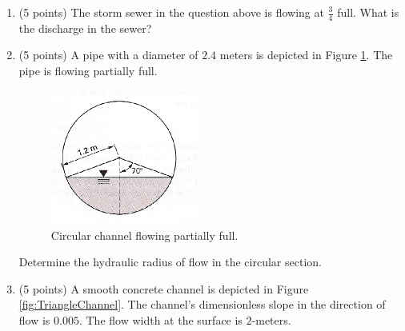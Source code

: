 \documentclass[12pt]{article}
\begin{document}
\begin{enumerate}
\clearpage
\item (5 points) The storm sewer in the question above is flowing at $\frac{3}{4}$ full.  What is the discharge in the sewer?
\clearpage
\item  (5 points) A pipe with a diameter of $2.4$ meters is depicted in Figure \ref{fig:CircularSewerToo}.   The pipe is flowing partially full.

\begin{figure}[h!] %
\centering
   \includegraphics[width=1.9in]{CircularSewerToo.jpg}
   \caption{Circular channel flowing partially full.}
   \label{fig:CircularSewerToo} 
\end{figure}

Determine the hydraulic radius of flow in the circular section.
~\clearpage
\item  (5 points) A smooth concrete channel is depicted in Figure \ref{fig:TriangleChannel}.  The channel's dimensionless slope in the direction of flow is $0.005$.  The flow width at the surface is $2$-meters. 


\end{enumerate}
\end{document}
